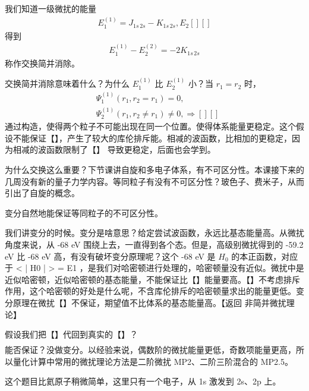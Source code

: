 我们知道一级微扰的能量
\begin{align}
    E_1^{(1)} = J_{1s\,2s} - K_{1s\,2s}, E_2 [][]
\end{align}
得到
\begin{align}
    E_1^{(1)} - E_2^{(2)} = - 2K_{1s\,2s}
\end{align}
称作交换简并消除。

交换简并消除意味着什么？为什么 $E^{(1)}_1$ 比 $E^{(1)}_2$ 小？当 $r_1 = r_2$ 时，
\begin{align}
    &\Psi_1^{(1)} (r_1, r_2 = r_1) = 0, \\
    &\Psi_2^{(1)} (r_1, r_2 \neq r_1) \neq 0, \Rightarrow [][]
\end{align}
通过构造，使得两个粒子不可能出现在同一个位置。使得体系能量更稳定。这个假设不能保证【】，产生了较大的库伦排斥能。相减的波函数，比相加的更稳定，因为相减的波函数限制了【】
导致更稳定，后面也会学到。

为什么交换这么重要？下节课讲自旋和多电子体系，有不可区分性。本课接下来的几周没有新的量子力学内容。等同粒子有没有不可区分性？玻色子、费米子，从而引出了自旋的概念。

变分自然地能保证等同粒子的不可区分性。

我们讲变分的时候。变分是啥意思？给定尝试波函数，永远比基态能量高。从微扰角度来说，从 -68 eV 围绕上去，一直得到各个态。但是，高级别微扰得到的 -59.2 eV 比 -68 eV 高，有没有破坏变分原理呢？这个 -68 eV 是 $H_0$ 的本正函数，对应于 < | H0 | > = E1 ，是我们对哈密顿进行处理的，哈密顿量没有近似。微扰中是近似哈密顿，近似哈密顿的基态能量，不能保证比【】能量要高。【】不考虑排斥作用，这个哈密顿的好处是什么呢，不含库伦排斥的哈密顿量求出的能量更低。变分原理在微扰【】不保证，期望值不比体系的基态能量高。【返回 非简并微扰理论】

假设我们把【】代回到真实的【】？
\begin{align}
    [][]
\end{align}
能否保证？没做变分。以经验来说，偶数阶的微扰能量更低，奇数项能量更高，所以量化计算中常用的微扰理论方法是二阶微扰 MP2、二阶三阶混合的 MP2.5。

这个题目比氦原子稍微简单，这里只有一个电子，从 1s 激发到 2s、2p 上。

